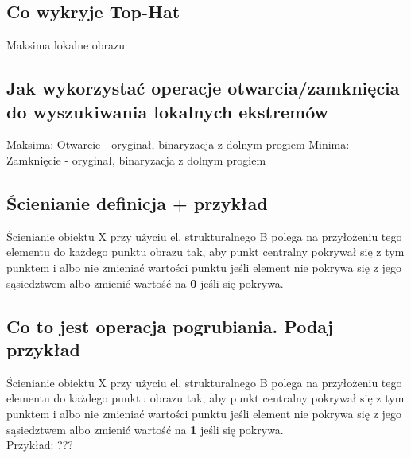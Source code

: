 \documentclass[a4paper, 12pt, titlepage]{article}
\begin{document}
\subsection{Co wykryje Top-Hat}
Maksima lokalne obrazu

\subsection{Jak wykorzystać operacje otwarcia/zamknięcia do wyszukiwania lokalnych ekstremów}
Maksima: Otwarcie - oryginał, binaryzacja z dolnym progiem
Minima: Zamknięcie - oryginał, binaryzacja z dolnym progiem

\subsection{Ścienianie definicja + przykład}
Ścienianie obiektu X przy użyciu el. strukturalnego B polega na przyłożeniu tego elementu do każdego punktu obrazu tak, aby punkt centralny pokrywał się z tym punktem i albo nie zmieniać wartości punktu jeśli element nie pokrywa się z jego sąsiedztwem albo zmienić wartość na \textbf{0} jeśli się pokrywa.

\subsection{Co to jest operacja pogrubiania. Podaj przykład}
Ścienianie obiektu X przy użyciu el. strukturalnego B polega na przyłożeniu tego elementu do każdego punktu obrazu tak, aby punkt centralny pokrywał się z tym punktem i albo nie zmieniać wartości punktu jeśli element nie pokrywa się z jego sąsiedztwem albo zmienić wartość na \textbf{1} jeśli się pokrywa. \\
Przykład: ???
\end{document}
